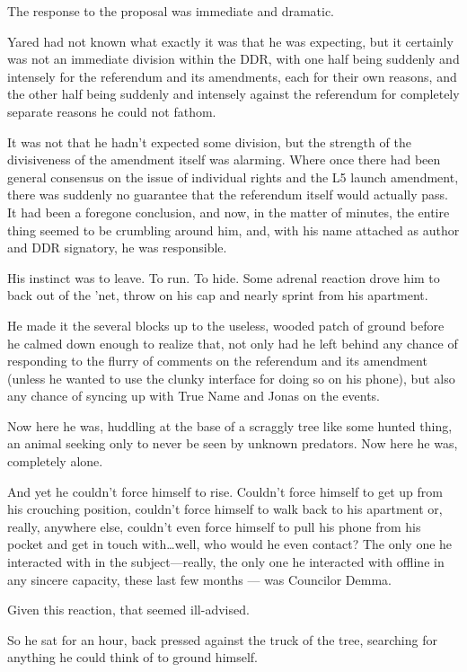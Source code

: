 \noindent The response to the proposal was immediate and dramatic.

Yared had not known what exactly it was that he was expecting, but it certainly was not an immediate division within the DDR, with one half being suddenly and intensely for the referendum and its amendments, each for their own reasons, and the other half being suddenly and intensely against the referendum for completely separate reasons he could not fathom.

It was not that he hadn't expected some division, but the strength of the divisiveness of the amendment itself was alarming. Where once there had been general consensus on the issue of individual rights and the L5 launch amendment, there was suddenly no guarantee that the referendum itself would actually pass. It had been a foregone conclusion, and now, in the matter of minutes, the entire thing seemed to be crumbling around him, and, with his name attached as author and DDR signatory, he was responsible.

His instinct was to leave. To run. To hide. Some adrenal reaction drove him to back out of the 'net, throw on his cap and nearly sprint from his apartment.

He made it the several blocks up to the useless, wooded patch of ground before he calmed down enough to realize that, not only had he left behind any chance of responding to the flurry of comments on the referendum and its amendment (unless he wanted to use the clunky interface for doing so on his phone), but also any chance of syncing up with True Name and Jonas on the events.

Now here he was, huddling at the base of a scraggly tree like some hunted thing, an animal seeking only to never be seen by unknown predators. Now here he was, completely alone.

And yet he couldn't force himself to rise. Couldn't force himself to get up from his crouching position, couldn't force himself to walk back to his apartment or, really, anywhere else, couldn't even force himself to pull his phone from his pocket and get in touch with\ldots well, who would he even contact? The only one he interacted with in the subject---really, the only one he interacted with offline in any sincere capacity, these last few months — was Councilor Demma.

Given this reaction, that seemed ill-advised.

So he sat for an hour, back pressed against the truck of the tree, searching for anything he could think of to ground himself.

